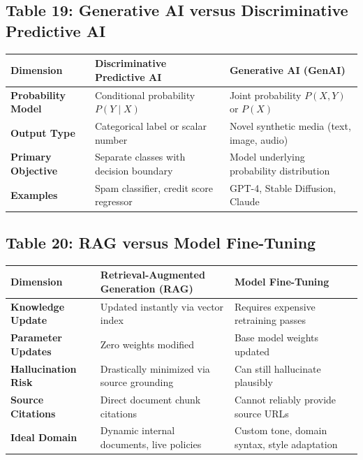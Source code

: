 \subsection*{Table 19: Generative AI versus Discriminative Predictive AI}
\begin{center}
\small
\begin{tabularx}{\textwidth}{lXX}
\toprule
\textbf{Dimension} & \textbf{Discriminative Predictive AI} & \textbf{Generative AI (GenAI)} \\
\midrule
\textbf{Probability Model} & Conditional probability $P(Y \mid X)$ & Joint probability $P(X, Y)$ or $P(X)$ \\
\textbf{Output Type} & Categorical label or scalar number & Novel synthetic media (text, image, audio) \\
\textbf{Primary Objective} & Separate classes with decision boundary & Model underlying probability distribution \\
\textbf{Examples} & Spam classifier, credit score regressor & GPT-4, Stable Diffusion, Claude \\
\bottomrule
\end{tabularx}
\end{center}

\subsection*{Table 20: RAG versus Model Fine-Tuning}
\begin{center}
\small
\begin{tabularx}{\textwidth}{lXX}
\toprule
\textbf{Dimension} & \textbf{Retrieval-Augmented Generation (RAG)} & \textbf{Model Fine-Tuning} \\
\midrule
\textbf{Knowledge Update} & Updated instantly via vector index & Requires expensive retraining passes \\
\textbf{Parameter Updates} & Zero weights modified & Base model weights updated \\
\textbf{Hallucination Risk} & Drastically minimized via source grounding & Can still hallucinate plausibly \\
\textbf{Source Citations} & Direct document chunk citations & Cannot reliably provide source URLs \\
\textbf{Ideal Domain} & Dynamic internal documents, live policies & Custom tone, domain syntax, style adaptation \\
\bottomrule
\end{tabularx}
\end{center}

